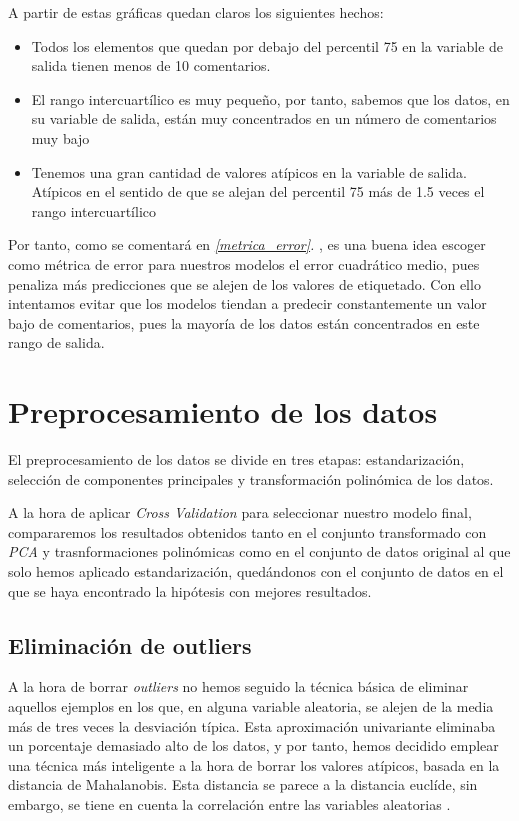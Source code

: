 \documentclass[11pt]{article}
\begin{document}
A partir de estas gráficas quedan claros los siguientes hechos:

\begin{itemize}
  \item Todos los elementos que quedan por debajo del percentil 75 en la variable de salida tienen menos de 10 comentarios.
  \item El rango intercuartílico es muy pequeño, por tanto, sabemos que los datos, en su variable de salida, están muy concentrados en un número de comentarios muy bajo
  \item Tenemos una gran cantidad de valores atípicos en la variable de salida. Atípicos en el sentido de que se alejan del percentil 75 más de 1.5 veces el rango intercuartílico
\end{itemize}

Por tanto, como se comentará en \emph{\ref{metrica_error}. }, es una buena idea escoger como métrica de error para nuestros modelos el error cuadrático medio, pues penaliza más predicciones que se alejen de los valores de etiquetado. Con ello intentamos evitar que los modelos tiendan a predecir constantemente un valor bajo de comentarios, pues la mayoría de los datos están concentrados en este rango de salida.
\pagebreak

\section{Preprocesamiento de los datos} \label{preprocesado}

El preprocesamiento de los datos se divide en tres etapas: estandarización, selección de componentes principales y transformación polinómica de los datos.

A la hora de aplicar \emph{Cross Validation} para seleccionar nuestro modelo final, compararemos los resultados obtenidos tanto en el conjunto transformado con \emph{PCA} y trasnformaciones polinómicas como en el conjunto de datos original al que solo hemos aplicado estandarización, quedándonos con el conjunto de datos en el que se haya encontrado la hipótesis con mejores resultados.

\subsection{Eliminación de outliers}

A la hora de borrar \emph{outliers} no hemos seguido la técnica básica de eliminar aquellos ejemplos en los que, en alguna variable aleatoria, se alejen de la media más de tres veces la desviación típica. Esta aproximación univariante eliminaba un porcentaje demasiado alto de los datos, y por tanto, hemos decidido emplear una técnica más inteligente a la hora de borrar los valores atípicos, basada en la distancia de Mahalanobis. Esta distancia se parece a la distancia euclíde, sin embargo, se tiene en cuenta la correlación entre las variables aleatorias \cite{wiki_mahalanobis:online}.
\end{document}
